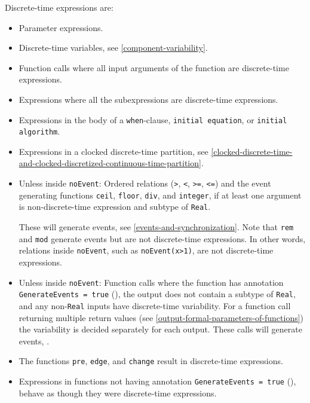 Discrete-time expressions are:
\begin{itemize}
\item
  Parameter expressions.
\item
  Discrete-time variables, see \cref{component-variability}.
\item
  Function calls where all input arguments of the function are discrete-time expressions.
\item
  Expressions where all the subexpressions are discrete-time expressions.
\item
  Expressions in the body of a \lstinline!when!-clause, \lstinline!initial equation!, or \lstinline!initial algorithm!.
\item
  Expressions in a clocked discrete-time partition, see \cref{clocked-discrete-time-and-clocked-discretized-continuous-time-partition}.
\item
  Unless inside \lstinline!noEvent!: Ordered relations (\lstinline!>!, \lstinline!<!, \lstinline!>=!, \lstinline!<=!) and the event generating functions \lstinline!ceil!, \lstinline!floor!, \lstinline!div!, and \lstinline!integer!, if at least one argument is non-discrete-time expression and subtype of \lstinline!Real!.
  \begin{nonnormative}
  These will generate events, see \cref{events-and-synchronization}.
  Note that \lstinline!rem! and \lstinline!mod! generate events but are not discrete-time expressions.
  In other words, relations inside \lstinline!noEvent!, such as \lstinline!noEvent(x>1)!, are not discrete-time expressions.
  \end{nonnormative}
\item
  Unless inside \lstinline!noEvent!: Function calls where the function has annotation \lstinline!GenerateEvents = true! (), the output does not contain a subtype of \lstinline!Real!, and any non-\lstinline!Real! inputs have discrete-time variability.
  For a function call returning multiple return values (see \cref{output-formal-parameters-of-functions}) the variability is decided separately for each output.
  These calls will generate events, .
\item
  The functions \lstinline!pre!, \lstinline!edge!, and \lstinline!change! result in discrete-time expressions.
\item
  Expressions in functions not having annotation \lstinline!GenerateEvents = true! (), behave as though they were discrete-time expressions.
\end{itemize}

